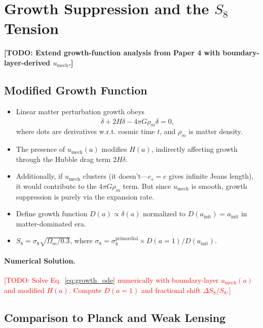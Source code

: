 \documentclass[11pt,a4paper]{article}
\newcommand{\umech}{\ensuremath{u_{\mathrm{mech}}}}
\newcommand{\Omm}{\ensuremath{\Omega_m}}
\theoremstyle{definition}
\theoremstyle{remark}
\begin{document}
\section{Growth Suppression and the $S_8$ Tension}
\label{sec:s8_tension}

\textbf{[TODO: Extend growth-function analysis from Paper 4 with boundary-layer-derived $\umech$.]}

\subsection{Modified Growth Function}
\label{sec:growth_function}

\begin{itemize}[leftmargin=*, itemsep=0.3em]
\item Linear matter perturbation growth obeys
\begin{equation}
\ddot{\delta} + 2H\dot{\delta} - 4\pi G \rho_m \delta = 0,
\label{eq:growth_ode}
\end{equation}
where dots are derivatives w.r.t. cosmic time $t$, and $\rho_m$ is matter density.
\item The presence of $\umech(a)$ modifies $H(a)$, indirectly affecting growth through the Hubble drag term $2H\dot{\delta}$.
\item Additionally, if $\umech$ clusters (it doesn't---$c_s = c$ gives infinite Jeans length), it would contribute to the $4\pi G \rho_m$ term. But since $\umech$ is smooth, growth suppression is purely via the expansion rate.
\item Define growth function $D(a) \propto \delta(a)$ normalized to $D(a_{\mathrm{init}}) = a_{\mathrm{init}}$ in matter-dominated era.
\item $S_8 = \sigma_8 \sqrt{\Omm/0.3}$, where $\sigma_8 = \sigma_8^{\mathrm{primordial}} \times D(a=1)/D(a_{\mathrm{init}})$.
\end{itemize}

\paragraph{Numerical Solution.}
\textcolor{red}{[TODO: Solve Eq.~\ref{eq:growth_ode} numerically with boundary-layer $\umech(a)$ and modified $H(a)$. Compute $D(a=1)$ and fractional shift $\Delta S_8/S_8$.]}

\subsection{Comparison to Planck and Weak Lensing}
\label{sec:s8_comparison}
\end{document}
